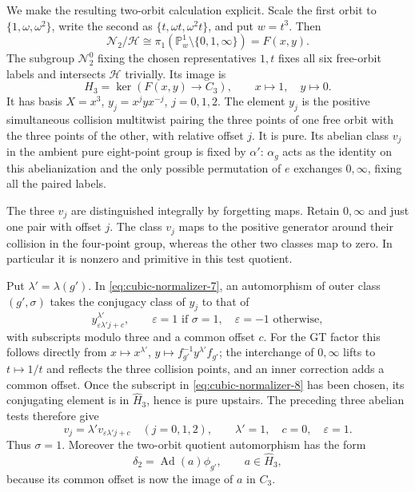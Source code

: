 We make the resulting two-orbit calculation explicit. Scale
the first orbit to $\{1,\omega,\omega^2\}$, write the
second as $\{t,\omega t,\omega^2t\}$, and put $w=t^3$.
Then
\[
 \mathcal N_2/\mathcal H\cong\pi_1(\mathbb P^1_w\setminus\{0,1,\infty\})
       =F(x,y).
\]
The subgroup $\mathcal N_2^0$ fixing the chosen representatives $1,t$
fixes all six free-orbit labels and intersects $\mathcal H$ trivially.
Its image is
\begin{equation}\label{eq:cubic-normalizer-7}
H_3=\ker(F(x,y)\longrightarrow C_3),\qquad x\mapsto1,
 \quad y\mapsto0.
\end{equation}
It has basis $X=x^3$, $y_j=x^jyx^{-j}$, $j=0,1,2$.
The element $y_j$ is the positive simultaneous collision
multitwist pairing the three points of one free orbit with
the three points of the other, with relative offset $j$.
It is pure. Its abelian class $v_j$ in the ambient pure
eight-point group is fixed by $\alpha'$: $\alpha_g$ acts
as the identity on this abelianization and the only possible
permutation of $e$ exchanges $0,\infty$, fixing all the
paired labels.

The three $v_j$ are distinguished integrally by forgetting
maps. Retain $0,\infty$ and just one pair with offset $j$.
The class $v_j$ maps to the positive generator around their
collision in the four-point group, whereas the other two
classes map to zero. In particular it is nonzero and
primitive in this test quotient.

Put $\lambda'=\lambda(g')$. In \eqref{eq:cubic-normalizer-7}, an automorphism of
outer class $(g',\sigma)$ takes the conjugacy class of $y_j$
to that of
\begin{equation}\label{eq:cubic-normalizer-8}
y_{\varepsilon\lambda'j+c}^{\lambda'},
 \qquad \varepsilon=1\text{ if }\sigma=1,
 \quad\varepsilon=-1\text{ otherwise},
\end{equation}
with subscripts modulo three and a common offset $c$.
For the GT factor this follows directly from
$x\mapsto x^{\lambda'}$, $y\mapsto f_{g'}^{-1}y^{\lambda'}f_{g'}$;
the interchange of $0,\infty$ lifts to $t\mapsto1/t$ and
reflects the three collision points, and an inner correction
adds a common offset. Once the subscript in \eqref{eq:cubic-normalizer-8} has been
chosen, its conjugating element is in $\widehat H_3$, hence
is pure upstairs.
The preceding three abelian tests therefore give
\begin{equation}\label{eq:cubic-normalizer-9}
v_j=\lambda'v_{\varepsilon\lambda'j+c}
 \quad(j=0,1,2),\qquad
 \lambda'=1,\quad c=0,\quad\varepsilon=1.
\end{equation}
Thus $\sigma=1$. Moreover the two-orbit quotient
automorphism has the form
\begin{equation}\label{eq:cubic-normalizer-10}
\delta_2=\operatorname{Ad}(a)\phi_{g'},
                  \qquad a\in\widehat H_3,
\end{equation}
because its common offset is now the image of $a$ in $C_3$.

